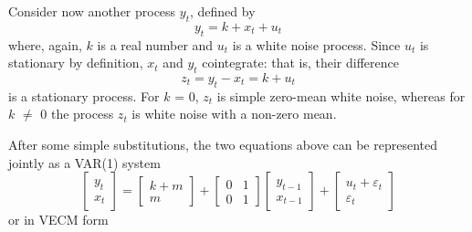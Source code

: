 Consider now another process $y_t$, defined by
%      
\[ y_t = k + x_t + u_t \] 
%
where, again, $k$ is a real number and $u_t$ is a white noise process.
Since $u_t$ is stationary by definition, $x_t$ and $y_t$ cointegrate:
that is, their difference
%      
\[ z_t = y_t - x_t = k + u_t \]
%	
is a stationary process. For $k$ = 0, $z_t$ is simple zero-mean white
noise, whereas for $k$ $\ne$ 0 the process $z_t$ is white noise with a
non-zero mean.
  
After some simple substitutions, the two equations above can be
represented jointly as a VAR(1) system
%      
\[ \left[ \begin{array}{c} y_t \\ x_t \end{array} \right] = \left[
  \begin{array}{c} k + m \\ m \end{array} \right] + \left[
  \begin{array}{rr} 0 & 1 \\ 0 & 1 \end{array} \right] \left[
  \begin{array}{c} y_{t-1} \\ x_{t-1} \end{array} \right] + \left[
  \begin{array}{c} u_t + \varepsilon_t \\ \varepsilon_t \end{array}
\right] \]
%	
or in VECM form
%      
